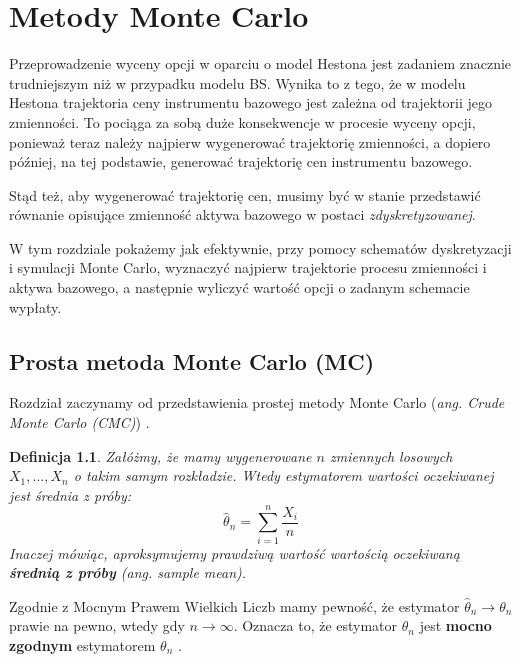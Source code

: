 \documentclass{pracamgr}
\newtheorem{defi}{Definicja}[section]
\begin{document}
\chapter{Metody Monte Carlo}
\label{chap:monteCarlo}

Przeprowadzenie wyceny opcji w oparciu o model Hestona jest zadaniem znacznie trudniejszym
niż w przypadku modelu BS. Wynika to z tego, że w modelu Hestona trajektoria 
ceny instrumentu bazowego jest zależna od trajektorii jego zmienności. To pociąga za sobą 
duże konsekwencje w procesie wyceny opcji, ponieważ teraz należy najpierw wygenerować trajektorię
zmienności, a dopiero później, na tej podstawie, generować trajektorię cen instrumentu bazowego.

Stąd też, aby wygenerować trajektorię cen, musimy być w stanie przedstawić równanie opisujące
zmienność aktywa bazowego w postaci \textit{zdyskretyzowanej}.

W tym rozdziale pokażemy jak efektywnie, przy pomocy schematów dyskretyzacji i symulacji Monte Carlo, 
wyznaczyć najpierw trajektorie procesu zmienności i aktywa bazowego, a następnie wyliczyć wartość
opcji o zadanym schemacie wypłaty.

\section{Prosta metoda Monte Carlo (MC)}
\label{sec:mc}

Rozdział zaczynamy od przedstawienia prostej metody 
Monte Carlo (\textit{ang. Crude Monte Carlo (CMC)}) \cite{Niemiro}.

\begin{defi}
Załóżmy, że mamy wygenerowane $n$ zmiennych losowych $X_1, ..., X_n$ o takim samym rozkładzie. 
Wtedy estymatorem wartości oczekiwanej jest średnia z próby:
\begin{equation}
  \hat{\theta}_n = \sum_{i=1}^n \frac{X_i}{n}
\end{equation}
Inaczej mówiąc, aproksymujemy prawdziwą wartość wartością 
oczekiwaną \textbf{średnią z próby} (\textit{ang. sample mean}).
\end{defi}


Zgodnie z Mocnym Prawem Wielkich Liczb mamy pewność, że estymator 
$\hat{\theta}_n \rightarrow \theta_n$ prawie na pewno, wtedy gdy $n \rightarrow \infty$. 
Oznacza to, że estymator $\hat{\theta}_n $ jest \textbf{mocno zgodnym} 
estymatorem $\theta_n$ \cite{Glasserman}.
\end{document}
